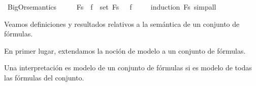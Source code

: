 \begin{isabellebody}
\isamarkupfalse%
%
\endisatagproof
{\isafoldproof}%
%
\isadelimproof
\isanewline
%
\endisadelimproof
\isanewline
{}\isamarkupfalse%
\ BigOr{\isacharunderscore}semantics{\isacharcolon}\ \isanewline
\ \ {\isachardoublequoteopen}{\isacharparenleft}{\isasymA}\ {\isasymTurnstile}\ \isactrlbold {\isasymOr}Fs{\isacharparenright}\ {\isasymlongleftrightarrow}\ {\isacharparenleft}{\isasymexists}f\ {\isasymin}\ set\ Fs{\isachardot}\ {\isasymA}\ {\isasymTurnstile}\ f{\isacharparenright}{\isachardoublequoteclose}\ \isanewline
%
\isadelimproof
\ \ %
\endisadelimproof
%
\isatagproof
{}\isamarkupfalse%
\ {\isacharparenleft}induction\ Fs{\isacharparenright}\ simp{\isacharunderscore}all%
\endisatagproof
{\isafoldproof}%
%
\isadelimproof
%
\endisadelimproof
%
\isadelimdocument
%
\endisadelimdocument
%
\isatagdocument
%
\isamarkuptrue%
%
\endisatagdocument
{\isafolddocument}%
%
\isadelimdocument
%
\endisadelimdocument
%
\begin{isamarkuptext}%
Veamos definiciones y resultados relativos a la semántica de un
  conjunto de fórmulas.
  
  En primer lugar, extendamos la noción de modelo a un conjunto de 
  fórmulas.

  \begin{definicion}
    Una interpretación es modelo de un conjunto de fórmulas si es 
    modelo de todas las fórmulas del conjunto.
  \end{definicion}


\end{isamarkuptext}
\end{isabellebody}
